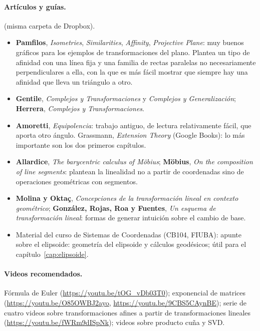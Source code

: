 \paragraph{Artículos y guías.} (misma carpeta de Dropbox).
\begin{itemize}
  \item \textbf{Pamfilos}, \emph{Isometries}, \emph{Similarities}, \emph{Affinity},
  \emph{Projective Plane}: muy buenos gráficos para los ejemplos de transformaciones del plano.
  Plantea un tipo de afinidad con una línea fija y una familia de rectas paralelas no
  necesariamente perpendiculares a ella, con la que es más fácil mostrar que siempre hay una
  afinidad que lleva un triángulo a otro.
  \item \textbf{Gentile}, \emph{Complejos y Transformaciones} y \emph{Complejos y
  Generalización}; \textbf{Herrera}, \emph{Complejos y Transformaciones}.
  \item \textbf{Amoretti}, \emph{Equipolencia}: trabajo antiguo, de lectura relativamente
  fácil, que aporta otro ángulo. Grassmann, \emph{Extension Theory} (Google Books): lo más
  importante son los dos primeros capítulos.
  \item \textbf{Allardice}, \emph{The barycentric calculus of Möbius}; \textbf{Möbius},
  \emph{On the composition of line segments}: plantean la linealidad no a partir de
  coordenadas sino de operaciones geométricas con segmentos.
  \item \textbf{Molina y Oktaç}, \emph{Concepciones de la transformación lineal en contexto
  geométrico}; \textbf{González, Rojas, Roa y Fuentes}, \emph{Un esquema de transformación
  lineal}: formas de generar intuición sobre el cambio de base.
  \item Material del curso de Sistemas de Coordenadas (CB104, FIUBA): apunte sobre el elipsoide:
  geometría del elipsoide y cálculos geodésicos; útil para el
  capítulo~\ref{cap:elipsoide}.
\end{itemize}

\paragraph{Videos recomendados.} Fórmula de Euler
(\url{https://youtu.be/tOG_vDb03T0}); exponencial de matrices
(\url{https://youtu.be/O85OWBJ2ayo}, \url{https://youtu.be/9CBS5CAynBE}); serie de cuatro videos sobre
transformaciones afines a partir de transformaciones lineales
(\url{https://youtu.be/fWRm9dISpNk}); videos sobre producto cuña y SVD.
